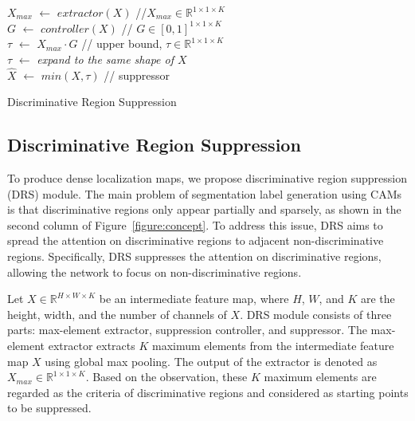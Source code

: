 \documentclass[letterpaper]{article} \usepackage{aaai21}  \usepackage{times}  \usepackage{helvet} \usepackage{courier}  \usepackage[hyphens]{url}  \usepackage{graphicx} \urlstyle{rm} \def\UrlFont{\rm}  \usepackage{natbib}  \usepackage{caption} \frenchspacing  \setlength{\pdfpagewidth}{8.5in}  \setlength{\pdfpageheight}{11in}
\begin{document}
\begin{algorithm}[t]
    {
    \vspace{3mm}
    $X_{max}$ $\gets$ $extractor(X)$ \hspace{3mm}//$X_{max} \in \mathbb{R}^{1 \times 1 \times K}$ \\
    \vspace{2mm}
    $G$ $\gets$ $controller(X)$ \hspace{8mm}//  $G \in [0, 1]^{1 \times 1 \times K}$ \\
    \vspace{1mm}
    $\tau$ $\gets$ $X_{max} \cdot G$ \hspace{12mm}// upper bound, $\tau \in \mathbb{R}^{1 \times 1 \times K}$ \\
    \vspace{2mm}
    $\tau$ $\gets$ \textit{expand to the same shape of $X$} \\
    \vspace{2mm}
    $\hat{X}$ $\gets$ $min(X, \tau)$ \hspace{13mm}// suppressor \\
    }
\caption{Discriminative Region Suppression}
\label{DRS_algorithm}
\end{algorithm}



\subsection{Discriminative Region Suppression}
\label{method:2}
To produce dense localization maps, we propose discriminative region suppression (DRS) module.
The main problem of segmentation label generation using CAMs is that discriminative regions only appear partially and sparsely, as shown in the second column of Figure~\ref{figure:concept}.
To address this issue, DRS aims to spread the attention on discriminative regions to adjacent non-discriminative regions.
Specifically, DRS suppresses the attention on discriminative regions, allowing the network to focus on non-discriminative regions.

Let $X \in \mathbb{R}^{H \times W \times K}$ be an intermediate feature map, where $H$, $W$, and $K$ are the height, width, and the number of channels of $X$.
DRS module consists of three parts: max-element extractor, suppression controller, and suppressor.
The max-element extractor extracts $K$ maximum elements from the intermediate feature map $X$ using global max pooling.
The output of the extractor is denoted as $X_{max} \in \mathbb{R}^{1 \times 1 \times K}$. 
Based on the observation, these $K$ maximum elements are regarded as the criteria of discriminative regions and considered as starting points to be suppressed.
\end{document}
